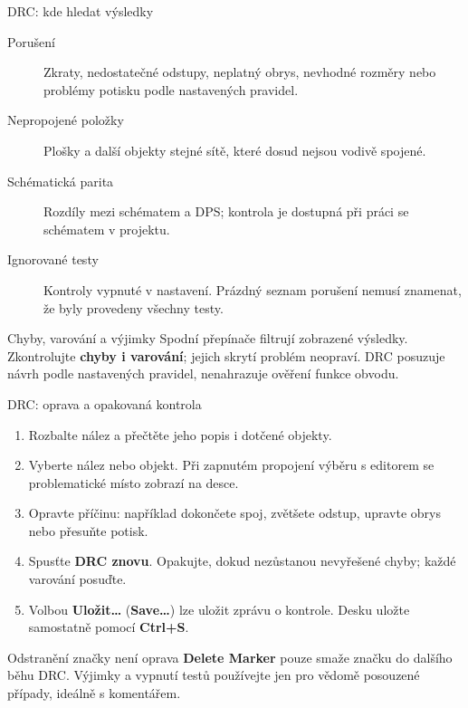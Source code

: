 \documentclass{beamer}
\begin{document}
\begin{frame}[t]{DRC: kde hledat výsledky}
	\small
	\begin{description}
		\item[Porušení] Zkraty, nedostatečné odstupy, neplatný obrys, nevhodné rozměry nebo problémy potisku podle nastavených pravidel.
		\item[Nepropojené položky] Plošky a další objekty stejné sítě, které dosud nejsou vodivě spojené.
		\item[Schématická parita] Rozdíly mezi schématem a DPS; kontrola je dostupná při práci se schématem v projektu.
		\item[Ignorované testy] Kontroly vypnuté v nastavení. Prázdný seznam porušení nemusí znamenat, že byly provedeny všechny testy.
	\end{description}
	\begin{block}{Chyby, varování a výjimky}
	Spodní přepínače filtrují zobrazené výsledky. Zkontrolujte \textbf{chyby i varování}; jejich skrytí problém neopraví. DRC posuzuje návrh podle nastavených pravidel, nenahrazuje ověření funkce obvodu.
	\end{block}
\end{frame}

\begin{frame}[t]{DRC: oprava a opakovaná kontrola}
	\begin{enumerate}
		\item Rozbalte nález a přečtěte jeho popis i dotčené objekty.
		\item Vyberte nález nebo objekt. Při zapnutém propojení výběru s editorem se problematické místo zobrazí na desce.
		\item Opravte příčinu: například dokončete spoj, zvětšete odstup, upravte obrys nebo přesuňte potisk.
		\item Spusťte \textbf{DRC znovu}. Opakujte, dokud nezůstanou nevyřešené chyby; každé varování posuďte.
		\item Volbou \textbf{Uložit\ldots} (\textbf{Save\ldots}) lze uložit zprávu o kontrole. Desku uložte samostatně pomocí \textbf{Ctrl+S}.
	\end{enumerate}
	\begin{block}{Odstranění značky není oprava}
	\textbf{Delete Marker} pouze smaže značku do dalšího běhu DRC. Výjimky a vypnutí testů používejte jen pro vědomě posouzené případy, ideálně s komentářem.
	\end{block}
\end{frame}
\end{document}
